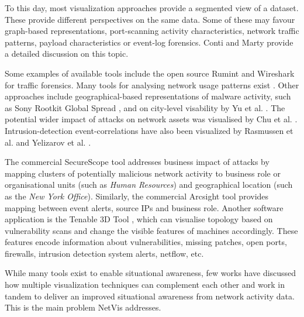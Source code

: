 To this day, most visualization approaches provide a segmented view of a dataset. These 
provide different perspectives on the same data. Some of these may favour graph-based 
representations, port-scanning activity characteristics, network traffic patterns, payload 
characteristics or event-log forensics. Conti \cite{Conti} and Marty \cite{marty2009applied} 
provide a detailed discussion on this topic. 

Some examples of available tools include the open source Rumint \cite{rumint} and Wireshark
\cite{wireshark} for traffic forensics. Many tools for analysing network usage patterns
exist \cite{best2010, RADAR, lau2004spinning, liao2010}. Other approaches include geographical-based
representations of malware activity, such as Sony Rootkit Global Spread \cite{Conti}, and on
city-level visability by Yu et al. \cite{yu2010}. The potential wider impact of attacks on network
assets was visualised by Chu et al. \cite{chu2010}. Intrusion-detection event-correlations have also
been visualized by Rasmussen et al. \cite{rasmussen2010} and Yelizarov et al. \cite{yelizarov2009}.

The commercial SecureScope tool \cite{securescope} addresses business impact of attacks by mapping
clusters of potentially malicious network activity to business role or organisational units (such as
\textit{Human Resources}) and geographical location (such as the \textit{New York Office}).
Similarly, the commercial Arcsight tool \cite{arcsight} provides mapping between event alerts,
source IPs and business role. Another software application is the Tenable 3D Tool \cite{Tenable},
which can visualise topology based on vulnerability scans and change the visible features of
machines accordingly. These features encode information about vulnerabilities, missing patches, open
ports, firewalls, intrusion detection system alerts, netflow, etc.

While many tools exist to enable situational awareness, few works  
have discussed how multiple visualization techniques can complement each other and work in tandem 
to deliver an improved situational awareness from network activity data. This is the main problem 
NetVis addresses.
